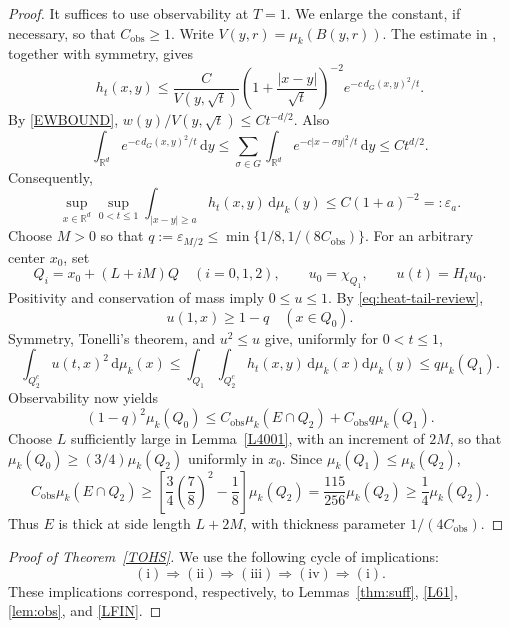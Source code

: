 \documentclass[12pt]{article}
\begin{document}
\begin{proof}
It suffices to use observability at $T=1$. We enlarge the constant, if necessary, so that $C_{\mathrm{obs}}\ge1$. Write $V(y,r)=\mu_k(B(y,r))$. The estimate in \cite[Remark~3.3, equation~(3.12)]{JDA1}, together with symmetry, gives
\[
h_t(x,y)\le\frac{C}{V(y,\sqrt t)}
\left(1+\frac{|x-y|}{\sqrt t}\right)^{-2}e^{-c\,d_G(x,y)^2/t}.
\]
By \eqref{EWBOUND}, $w(y)/V(y,\sqrt t)\le Ct^{-d/2}$. Also
\[
\int_{\mathbb{R}^d}e^{-c\,d_G(x,y)^2/t}\,\mathrm{d}y
\le\sum_{\sigma\in G}\int_{\mathbb{R}^d}e^{-c|x-\sigma y|^2/t}\,\mathrm{d}y
\le C t^{d/2}.
\]
Consequently,
\begin{equation}\label{eq:heat-tail-review}
\sup_{x\in\mathbb{R}^d}\sup_{0<t\le1}
\int_{|x-y|\ge a}h_t(x,y)\,\mathrm{d}\mu_k(y)
\le C(1+a)^{-2}=:\varepsilon_a.
\end{equation}
Choose $M>0$ so that $q:=\varepsilon_{M/2}\le\min\{1/8,1/(8C_{\mathrm{obs}})\}$. For an arbitrary center $x_0$, set
\[
Q_i=x_0+(L+iM)Q\quad(i=0,1,2),\qquad u_0=\chi_{Q_1},\qquad u(t)=H_tu_0.
\]
Positivity and conservation of mass imply $0\le u\le1$. By \eqref{eq:heat-tail-review},
\begin{equation}\label{E531}
u(1,x)\ge1-q\quad(x\in Q_0).
\end{equation}
Symmetry, Tonelli's theorem, and $u^2\le u$ give, uniformly for $0<t\le1$,
\begin{equation}\label{E532}
\int_{Q_2^c}u(t,x)^2\,\mathrm{d}\mu_k(x)
\le\int_{Q_1}\int_{Q_2^c}h_t(x,y)\,\mathrm{d}\mu_k(x)\mathrm{d}\mu_k(y)
\le q\mu_k(Q_1).
\end{equation}
Observability now yields
\begin{equation}\label{E533}
(1-q)^2\mu_k(Q_0)\le C_{\mathrm{obs}}\mu_k(E\cap Q_2)
+C_{\mathrm{obs}}q\mu_k(Q_1).
\end{equation}
Choose $L$ sufficiently large in Lemma~\ref{L4001}, with an increment of $2M$, so that $\mu_k(Q_0)\ge(3/4)\mu_k(Q_2)$ uniformly in $x_0$. Since $\mu_k(Q_1)\le\mu_k(Q_2)$,
\[
C_{\mathrm{obs}}\mu_k(E\cap Q_2)
\ge\left[\frac34\left(\frac78\right)^2-\frac18\right]\mu_k(Q_2)
=\frac{115}{256}\mu_k(Q_2)\ge\frac14\mu_k(Q_2).
\]
Thus $E$ is thick at side length $L+2M$, with thickness parameter $1/(4C_{\mathrm{obs}})$.
\end{proof}


\begin{proof}[Proof of Theorem~\ref{TOHS}]
We use the following cycle of implications:
\[
(\mathrm{i}) \Rightarrow (\mathrm{ii}) \Rightarrow (\mathrm{iii}) \Rightarrow (\mathrm{iv}) \Rightarrow (\mathrm{i}).
\]
These implications correspond, respectively, to Lemmas~\ref{thm:suff}, \ref{L61}, \ref{lem:obs}, and \ref{LFIN}.
\end{proof}
\end{document}
